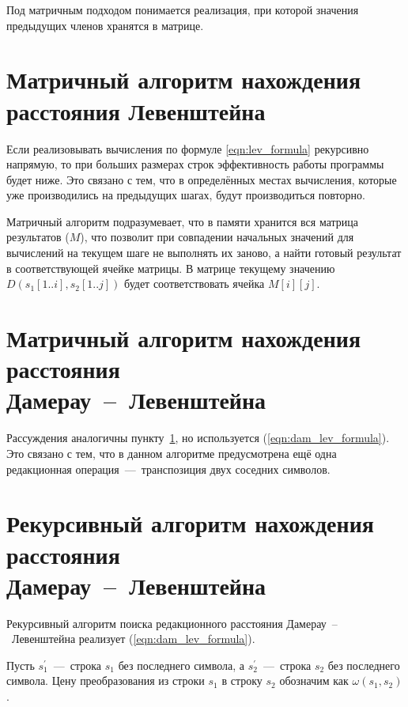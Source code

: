 Под матричным подходом понимается реализация, при которой значения предыдущих членов хранятся в матрице. 

\section{Матричный алгоритм нахождения расстояния Левенштейна}
\label{section:lev_matr}
Если реализовывать вычисления по формуле \ref{eqn:lev_formula} рекурсивно напрямую, то при больших размерах строк эффективность работы программы будет ниже. Это связано с тем, что в определённых местах вычисления, которые уже производились на предыдущих шагах, будут производиться повторно.

Матричный алгоритм подразумевает, что в памяти хранится вся матрица результатов ($M$), что позволит при совпадении начальных значений для вычислений на текущем шаге не выполнять их заново, а найти готовый результат в соответствующей ячейке матрицы. В матрице текущему значению $D(s_1[1..i], s_2[1..j])$ будет соответствовать ячейка $M[i][j]$.

\section{Матричный алгоритм нахождения расстояния \\Дамерау~--~Левенштейна}
\label{section:dam_lev_matr}
Рассуждения аналогичны пункту~\ref{section:lev_matr}, но используется (\ref{eqn:dam_lev_formula}). Это связано с тем, что в данном алгоритме предусмотрена ещё одна редакционная операция~---~транспозиция двух соседних символов.

\section{Рекурсивный алгоритм нахождения расстояния \\Дамерау~--~Левенштейна}
Рекурсивный алгоритм поиска редакционного расстояния Дамерау~--~Левенштейна реализует (\ref{eqn:dam_lev_formula}). 

Пусть $s_1^{'}$~---~строка $s_1$ без последнего символа, а $s_2^{'}$~---~строка $s_2$ без последнего символа. Цену преобразования из строки $s_1$ в строку $s_2$ обозначим как $\omega(s_1, s_2)$.

